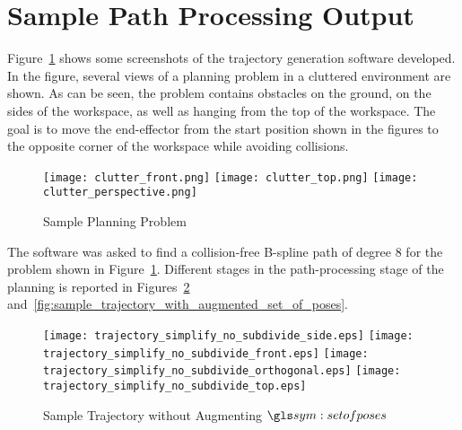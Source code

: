 \section{Sample Path Processing Output}%

	Figure~\ref{fig:sample_planning_problem} shows some screenshots of the
	trajectory generation software developed. In the figure, several views
	of a planning problem in a cluttered environment are shown. As can be
	seen, the problem contains obstacles on the ground, on the sides of the
	workspace, as well as hanging from the top of the workspace. The goal is
	to move the end-effector from the start position shown in the figures to
	the opposite corner of the workspace while avoiding collisions.

	\begin{figure}[hbt]
		\centering
		\texttt{[image: clutter\_front.png]}
		\texttt{[image: clutter\_top.png]}
		\texttt{[image: clutter\_perspective.png]}
		\caption{Sample Planning Problem}
		\label{fig:sample_planning_problem}
	\end{figure}

	The software was asked to find a collision-free B-spline path of degree 8
	for the problem shown in Figure~\ref{fig:sample_planning_problem}. Different
	stages in the path-processing stage of the planning is reported in
	Figures~\ref{fig:sample_trajectory_after_simplification}
	and~\ref{fig:sample_trajectory_with_augmented_set_of_poses}.


	\begin{figure}[hb]
		\centering
		\begin{minipage}{0.8\linewidth}
			\texttt{[image: trajectory\_simplify\_no\_subdivide\_side.eps]}
			\texttt{[image: trajectory\_simplify\_no\_subdivide\_front.eps]}
			\texttt{[image: trajectory\_simplify\_no\_subdivide\_orthogonal.eps]}
			\texttt{[image: trajectory\_simplify\_no\_subdivide\_top.eps]}
		\end{minipage}
		\caption{Sample Trajectory without Augmenting $\setofposes$}
		\label{fig:sample_trajectory_after_simplification}
	\end{figure}


